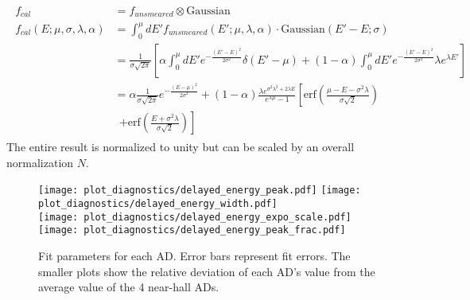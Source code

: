 \begin{align}
    \begin{split}
    f_{cal}    &= f_{unsmeared} \otimes \text{Gaussian} \\
    f_{cal}(E;\mu,\sigma,\lambda,\alpha) &= \int_0^\mu dE'
    f_{unsmeared}(E';\mu,\lambda,\alpha) \cdot \text{Gaussian}(E'-E; \sigma) \\
               &= \frac{1}{\sigma\sqrt{2\pi}}
               \left[
                   \alpha\int_0^\mu dE' e^{-\frac{(E'-E)^2}{2\sigma^2}} \delta(E'-\mu)
                   + (1-\alpha)\int_0^\mu dE' e^{-\frac{(E'-E)^2}{2\sigma^2}}
                   \lambda e^{\lambda E'}
               \right] \\
               &= \alpha\frac{1}{\sigma\sqrt{2\pi}}e^{-\frac{(E-\mu)^2}{2\sigma^2}}
               + (1-\alpha)
               \frac{\lambda e^{\sigma^2\lambda^2+2\lambda E}}{e^{\lambda\mu}-1}
               \left[
                   \text{erf}
                   \left(
                       \frac{\mu-E-\sigma^2\lambda}{\sigma\sqrt{2}}
                   \right)
                   \right. \\
               &\ \ \left.
                   + \text{erf}
                   \left(
                       \frac{E + \sigma^2\lambda}{\sigma\sqrt{2}}
                   \right)
               \right]
    \end{split}
\end{align}
The entire result is normalized to unity
but can be scaled by an overall normalization $N$.


\begin{figure}
    \centering
    \texttt{[image: plot\_diagnostics/delayed\_energy\_peak.pdf]}
    \vspace{0.5cm}\hspace{0.5cm}
    \texttt{[image: plot\_diagnostics/delayed\_energy\_width.pdf]}\\
    \texttt{[image: plot\_diagnostics/delayed\_energy\_expo\_scale.pdf]}
    \hspace{0.5cm}
    \texttt{[image: plot\_diagnostics/delayed\_energy\_peak\_frac.pdf]}\\
    \caption{
        Fit parameters for each AD.
        Error bars represent fit errors.
        The smaller plots show the relative deviation of each AD's value
        from the average value of the 4 near-hall ADs.
    }

    \label{fig:delayed_fit_parameters}
\end{figure}

